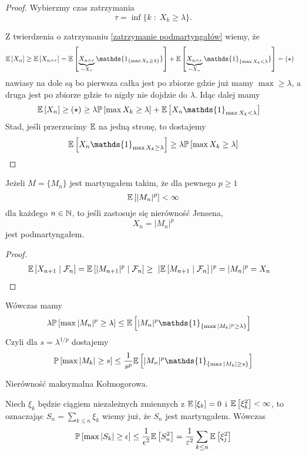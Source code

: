 \begin{proof}
  Wybierzmy czas zatrzymania
  $$\tau=\inf\{k\;:\;X_k\geq\lambda\}.$$

  Z twierdzenia o zatrzymaniu \ref{zatrzymanie podmartyngałów} wiemy, że
  \begin{align*}
    \expected{X_n}&\geq\expected{X_{n\land\tau}}= \expected{\underbrace{X_{n\land\tau}}_{=X_\tau}\mathds{1_{\{\max X_k\geq \lambda\}}}}+\expected{\underbrace{X_{n\land\tau}}_{=X_n}\mathds{1}_{\{\max X_k<\lambda}\}}=(\star)
  \end{align*}
  nawiasy na dole są bo pierwsza całka jest po zbiorze gdzie już mamy $\max\geq \lambda$, a druga jest po zbiorze gdzie to nigdy nie dojdzie do $\lambda$. Idąc dalej mamy
  \begin{align*}
    \expected{X_n}\geq (\star)&\geq \lambda\prob{\max X_k\geq\lambda}+\expected{X_n\mathds{1}_{\max X_k<\lambda}}
  \end{align*}
  Stad, jeśli przerzucimy $\expected$ na jedną stronę, to dostajemy
  $$\expected{X_n\mathds{1}_{\max X_k\geq \lambda}}\geq \lambda\prob{\max X_k\geq\lambda}$$
\end{proof}

\begin{conclusion}
  Jeżeli $M=\{M_n\}$ jest martyngałem takim, że dla pewnego $p\geq1$
  $$\expected{|M_n|^p}<\infty$$
  dla każdego $n\in\operatorname{\mathbb{N}}$, to jeśli zastosuje się nierówność Jensena,
  $$X_n=|M_n|^p$$
  jest podmartyngałem.
\end{conclusion}

\begin{proof}
  \begin{align*}
    \expected{X_{n+1}}{\set{F}_n}&=\expected{|M_{n+1}|^p}{\set{F}_n}\geq\ |\expected{M_{n+1}}{\set{F}_n}|^p=|M_n|^p=X_n
  \end{align*}
\end{proof}

Wówczas mamy
\begin{align*}
  \lambda\prob{\max|M_n|^p\geq\lambda}&\leq\expected{|M_n|^p\mathds{1}_{\{\max |M_k|^p\geq\lambda\}}}
\end{align*}
  Czyli dla $s=\lambda^{1/p}$ dostajemy
  $$\prob{\max |M_k|\geq s}\leq \frac{1}{s^p}\expected{|M_n|^p\mathds{1}_{\{\max |M_k|\geq s\}}}$$

\begin{example}
  \item Nierówność maksymalna Kołmogorowa.

    Niech $\xi_k$ będzie ciągiem niezależnych zmiennych z $\expected{\xi_k}=0$ i $\expected{\xi_k^2}<\infty$, to oznaczając $S_n=\sum_{k\leq n}\xi_k$ wiemy już, że $S_n$ jest martyngałem. Wówczas
    $$\prob{\max |S_k|\geq\epsilon}\leq\frac{1}{\epsilon^2}\expected{S_n^2}=\frac{1}{\varepsilon^2}\sum_{k\leq n}\expected{\xi_j^2}$$
\end{example}

